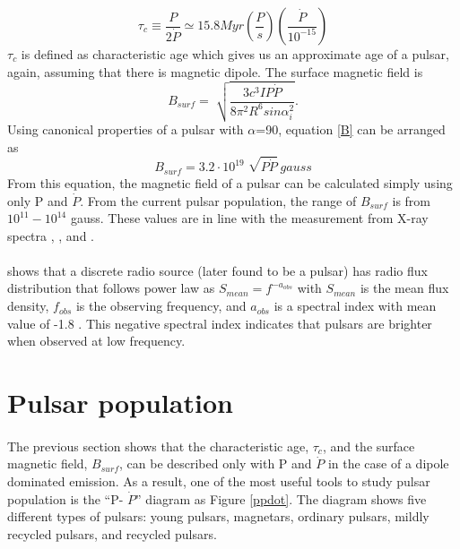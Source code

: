 \documentclass[thesis_msc.tex]{subfiles}
\begin{document}
   \begin{equation} \label{tc}
   \tau_c \equiv \frac{P}{2\dot{P}} \simeq 15.8 Myr (\frac{P}{s})(\frac{\dot{P}}{10^{-15}})
   \end{equation}
 $\tau_c$ is defined as characteristic age which gives us an approximate age of a pulsar, again, assuming that there is magnetic dipole. The surface magnetic field is  
    \begin{equation}\label{B}
    B_{surf}=\sqrt[]{\frac{3c^3IP\dot{P}}{8\pi^2R^6sin \alpha_i^2}}.
    \end{equation}
    Using canonical properties of a pulsar with $\alpha$=90, equation \ref{B} can be arranged as
    \begin{equation}
    B_{surf}=3.2\cdot10^{19}\sqrt[]{P\dot{P}} ~ gauss
    \end{equation}
 From this equation, the magnetic field of a pulsar can be calculated simply using only P and $\dot{P}$. From the current pulsar population, the range of $B_{surf}$ is from $10^{11}-10^{14}$ gauss. These values are in line with the measurement from X-ray spectra \citep{coburn2002magnetic}, \citep{bignami2003magnetic}, and \citep{kouveliotou1998x}.  
    
\paragraph{} \cite{conway1962radio} shows that a discrete radio source (later found to be a pulsar) has radio flux distribution that follows power law as $S_{mean} = f^{-a_{obs}}$ with $S_{mean}$ is the mean flux density, $f_{obs}$ is the observing frequency, and $a_{obs}$ is a spectral index with mean value of -1.8 \citep{maron2000pulsar}. This negative spectral index indicates that pulsars are brighter when observed at low frequency.      
   
\section{Pulsar population} \label{pulsartype}
    \paragraph{} The previous section shows that the characteristic age, $\tau_c$, and the surface magnetic field, $B_{surf}$, can be described only with P and $\dot{P}$ in the case of a dipole dominated emission. As a result, one of the most useful tools to study pulsar population is the ``P- $\dot{P}$'' diagram as Figure \ref{ppdot}.  The diagram shows five different types of pulsars: young pulsars, magnetars, ordinary pulsars, mildly recycled pulsars, and recycled pulsars. 
    
\end{document}
